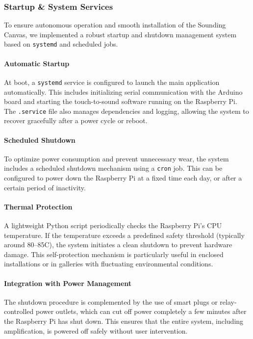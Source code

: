 \documentclass{article}
\begin{document}
\subsubsection{Startup \& System Services}
To ensure autonomous operation and smooth installation of the Sounding Canvas, we implemented a robust startup and shutdown management system based on \texttt{systemd} and scheduled jobs.

\paragraph{Automatic Startup}
At boot, a \texttt{systemd} service is configured to launch the main application automatically. This includes initializing serial communication with the Arduino board and starting the touch-to-sound software running on the Raspberry Pi. The \texttt{.service} file also manages dependencies and logging, allowing the system to recover gracefully after a power cycle or reboot.

\paragraph{Scheduled Shutdown}
To optimize power consumption and prevent unnecessary wear, the system includes a scheduled shutdown mechanism using a \texttt{cron} job. This can be configured to power down the Raspberry Pi at a fixed time each day, or after a certain period of inactivity.

\paragraph{Thermal Protection}
A lightweight Python script periodically checks the Raspberry Pi’s CPU temperature. If the temperature exceeds a predefined safety threshold (typically around 80–85\textdegree C), the system initiates a clean shutdown to prevent hardware damage. This self-protection mechanism is particularly useful in enclosed installations or in galleries with fluctuating environmental conditions.

\paragraph{Integration with Power Management}
The shutdown procedure is complemented by the use of smart plugs or relay-controlled power outlets, which can cut off power completely a few minutes after the Raspberry Pi has shut down. This ensures that the entire system, including amplification, is powered off safely without user intervention.
\end{document}
